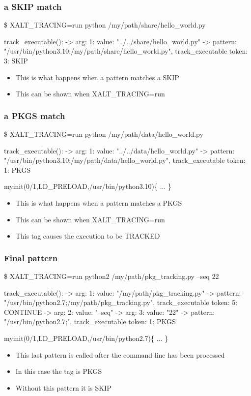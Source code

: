 \documentclass{beamer}
\begin{document}
\begin{frame}[fragile]
    \frametitle{a SKIP match}
 {\tiny
    \begin{semiverbatim}
\$ XALT\_TRACING=run python /my/path/share/hello\_world.py

    track_executable():
    -> arg: 1: value: "../../share/hello\_world.py"
    -> pattern: "/usr/bin/python3.10;/my/path/share/hello\_world.py",
       track_executable token: 3: SKIP
    \end{semiverbatim}
}
  \begin{itemize}
    \item This is what happens when a pattern matches a SKIP
    \item This can be shown when XALT\_TRACING=run
  \end{itemize}

\end{frame}

\begin{frame}[fragile]
    \frametitle{a PKGS match}
 {\tiny
    \begin{semiverbatim}
\$ XALT\_TRACING=run python /my/path/data/hello_world.py

    track\_executable():
    -> arg: 1: value: "../../data/hello\_world.py"
    -> pattern: "/usr/bin/python3.10;/my/path/data/hello\_world.py",
    track_executable token: 1: PKGS

myinit(0/1,LD\_PRELOAD,/usr/bin/python3.10)\{
...
\}
    \end{semiverbatim}
}
  \begin{itemize}
    \item This is what happens when a pattern matches a PKGS
    \item This can be shown when XALT\_TRACING=run
    \item This tag causes the execution to be TRACKED
  \end{itemize}

\end{frame}

\begin{frame}[fragile]
    \frametitle{Final pattern}
 {\tiny
    \begin{semiverbatim}
\$ XALT\_TRACING=run python2 /my/path/pkg\_tracking.py --seq 22

   track_executable():
    -> arg: 1: value: "/my/path/pkg\_tracking.py"
    -> pattern: "/usr/bin/python2.7;/my/path/pkg\_tracking.py",
       track_executable token: 5: CONTINUE
    -> arg: 2: value: "--seq"
    -> arg: 3: value: "22"
    -> pattern: "/usr/bin/python2.7;", track_executable token: 1: PKGS

myinit(0/1,LD_PRELOAD,/usr/bin/python2.7)\{
  ...
\}
    \end{semiverbatim}
}
  \begin{itemize}
    \item This last pattern is called after the command line has been
      processed
    \item In this case the tag is PKGS
    \item Without this pattern it is SKIP
  \end{itemize}

\end{frame}
\end{document}

